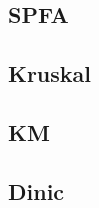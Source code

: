         \subsection{SPFA}
                
        \subsection{Kruskal}
                
        \subsection{KM}
                
        \subsection{Dinic}
                

